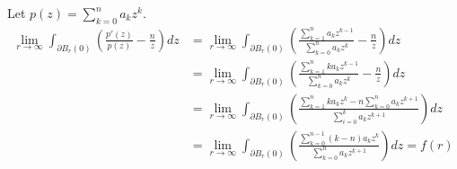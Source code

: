 \documentclass{homework}
\begin{document}
                                                                                                                                                                                                        \begin{solution}
                                                                                                                                                                                                        Let $\displaystyle{p(z) = \sum_{k=0}^n a_kz^k}$.
                                                                                                                                                                                                        \begin{align*}
                                                                                                                                                                                                            \lim_{r \to \infty} \int_{\partial B_r(0)} \left( \frac{p'(z)}{p(z)} - \frac{n}{z} \right) dz &= \lim_{r \to \infty} \int_{\partial B_r(0)} \left( \frac{\sum_{k=1}^n a_kz^{k-1} }{\sum_{k=0}^n a_kz^{k}} - \frac{n}{z} \right) dz \\
                                                                                                                                                                                                                &= \lim_{r \to \infty} \int_{\partial B_r(0)} \left( \frac{\sum_{k=1}^n ka_kz^{k-1} }{\sum_{k=0}^n a_kz^{k}} - \frac{n}{z} \right) dz \\
                                                                                                                                                                                                                    &= \lim_{r \to \infty} \int_{\partial B_r(0)} \left( \frac{\sum_{k=1}^n ka_kz^{k} - n\sum_{k=0}^n a_kz^{k+1} }{\sum_{i=0}^k a_kz^{k+1}} \right) dz \\
                                                                                                                                                                                                                        &= \lim_{r \to \infty} \int_{\partial B_r(0)} \left( \frac{\sum_{k=0}^{n-1} (k-n)a_kz^{k} }{\sum_{k=0}^n a_kz^{k+1}} \right) dz = f(r)
                                                                                                                                                                                                                        \end{align*}

\end{solution}
\end{document}
